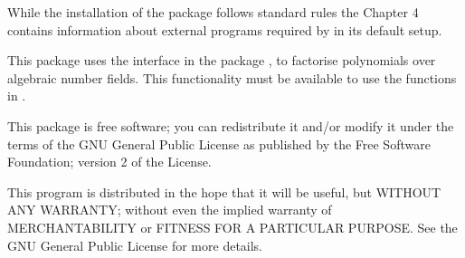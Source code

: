 While the installation of the package follows standard {\GAP} rules
the Chapter 4 contains information about external programs required by
{\Radiroot} in its default setup.


This package uses the interface in the package \Alnuth, to
factorise polynomials over algebraic number fields. This functionality must
be available to use the functions in {\Radiroot}.  


This package is free software; you can redistribute it and/or modify
it under the terms of the GNU General Public License as published by
the Free Software Foundation; version 2 of the License.

This program is distributed in the hope that it will be useful, but
WITHOUT ANY WARRANTY; without even the implied warranty of
MERCHANTABILITY or FITNESS FOR A PARTICULAR PURPOSE. See the GNU
General Public License for more details.

